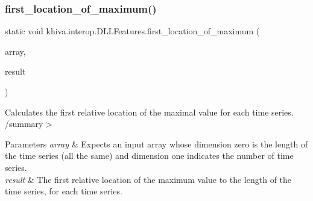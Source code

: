 \mbox{\label{classkhiva_1_1interop_1_1_d_l_l_features_ae70db85ecb8283db50c8b4b2bedc1af1}} 
\subsubsection{\texorpdfstring{first\+\_\+location\+\_\+of\+\_\+maximum()}{first\_location\_of\_maximum()}}
{\footnotesize\ttfamily static void khiva.\+interop.\+D\+L\+L\+Features.\+first\+\_\+location\+\_\+of\+\_\+maximum (\begin{DoxyParamCaption}\item[{\mbox{[}\+In\mbox{]} ref Int\+Ptr}]{array,  }\item[{\mbox{[}\+Out\mbox{]} out Int\+Ptr}]{result }\end{DoxyParamCaption})\hspace{0.3cm}{\ttfamily [static]}}



Calculates the first relative location of the maximal value for each time series. /summary$>$ 
\begin{DoxyParams}{Parameters}
{\em array} & Expects an input array whose dimension zero is the length of the time series (all the same) and dimension one indicates the number of time series.\\
\hline
{\em result} & The first relative location of the maximum value to the length of the time series, for each time series.\\
\hline
\end{DoxyParams}


\mbox{\label{classkhiva_1_1interop_1_1_d_l_l_features_a6d193c97885c6df4215c9d6802b83625}} 
